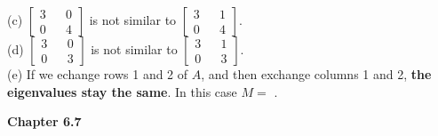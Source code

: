\documentclass[10pt,twoside,reqno]{article}
\begin{document}
\begin{enumerate}
\vspace{3mm}
(c) $\left[\begin{smallmatrix} 3 && 0\\ 0 && 4 \end{smallmatrix} \right]$ is not similar to $\left[\begin{smallmatrix} 3 && 1\\ 0 && 4 \end{smallmatrix} \right]$.\\


\vspace{3mm}
(d) $\left[\begin{smallmatrix} 3 && 0\\ 0 && 3 \end{smallmatrix} \right]$ is not similar to $\left[\begin{smallmatrix} 3 && 1\\ 0 && 3 \end{smallmatrix} \right]$.\\


\vspace{3mm}
(e) If we echange rows 1 and 2 of $A$, and then exchange columns 1 and 2, \textbf{the eigenvalues stay the same}. In this case $M =$ \underline{\hspace{7mm}}.\\


\vspace{3mm}
\end{enumerate}
\vspace{5mm}
\textbf{Chapter 6.7}
\end{document}
